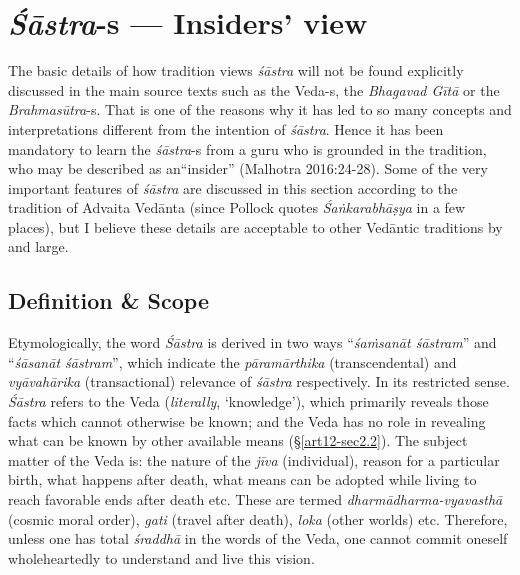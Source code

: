 \section{{{\sl\bfseries Śāstra}\relax}-s --- Insiders' view}\label{art12-sec2}

The basic details of how tradition views {\sl śāstra} will not be found explicitly discussed in the main source texts such as the Veda-s, the {\sl Bhagavad Gītā} or the {\sl Brahmasūtra}-s. That is one of the reasons why it has led to so many concepts and interpretations different from the intention of {\sl śāstra}. Hence it has been mandatory to learn the {\sl śāstra}-s from a guru who is grounded in the tradition, who may be described as an\break ``insider'' (Malhotra 2016:24-28). Some of the very important features of {\sl śāstra} are discussed in this section according to the tradition of Advaita Vedānta (since Pollock quotes {\sl Śaṅkarabhāṣya} in a few places), but I believe these details are acceptable to other Vedāntic traditions by and large.\\[-20pt]

\subsection{Definition \& Scope}\label{art12-sec2.1}

Etymologically, the word {\sl Śāstra} is derived in two ways ``{\sl śaṁsanāt śāstram}'' and ``{\sl śāsanāt śāstram}'', which indicate the {\sl pāramārthika} (transcendental) and {\sl vyāvahārika} (transactional) relevance of {\sl śāstra} respectively. In its restricted sense. {\sl Śāstra} refers to the Veda ({\sl literally}, `knowledge'), which primarily reveals those facts which cannot otherwise be known; and the Veda has no role in revealing what can be known by other available means (\S\ref{art12-sec2.2}). The subject matter of the Veda is: the nature of the {\sl jīva} (individual), reason for a particular birth, what happens after death, what means can be adopted while living to reach favorable ends after death etc. These are termed {\sl dharmādharma-vyavasthā} (cosmic moral order), {\sl gati} (travel after death), {\sl loka} (other worlds) etc. Therefore, unless one has total {\sl śraddhā} in the words of the Veda, one cannot commit oneself wholeheartedly to understand and live this vision. 

